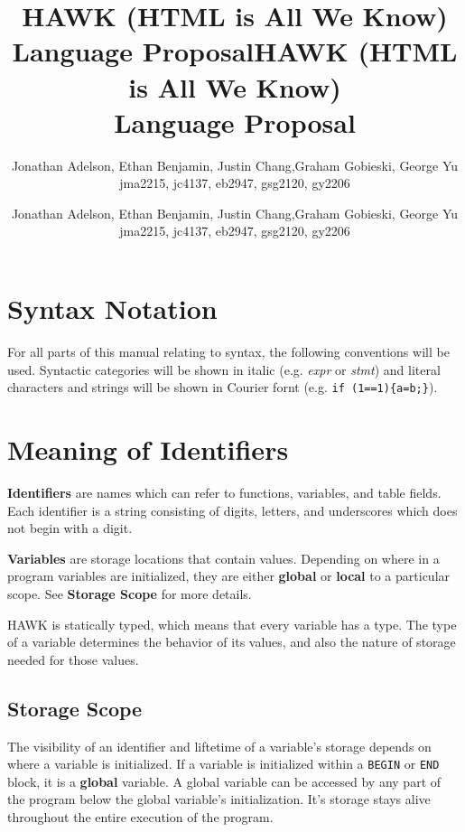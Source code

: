 \documentclass[12pt]{article}
\title{HAWK (HTML is All We Know)\\
Language Proposal}
\author{Jonathan Adelson, Ethan Benjamin, Justin Chang,Graham Gobieski, George Yu\\
jma2215, jc4137, eb2947, gsg2120, gy2206}
\date{}
\newcommand{\setdocdata}{
\title{HAWK (HTML is All We Know)\\
Language Proposal}
\author{Jonathan Adelson, Ethan Benjamin, Justin Chang,Graham Gobieski, George Yu\\
jma2215, jc4137, eb2947, gsg2120, gy2206}
\date{}
}
\begin{document}


\setdocdata
\maketitle

\section*{Syntax Notation}

For all parts of this manual relating to syntax, the following conventions will be used. Syntactic categories will be shown in italic (e.g. \textit{expr} or \textit{stmt}) and literal characters and strings will be shown in Courier fornt (e.g. \texttt{if (1==1)\{a=b;\}}).

\section*{Meaning of Identifiers}

\textbf{Identifiers} are names which can refer to functions, variables, and table fields. Each identifier is a string consisting of digits, letters, and underscores which does not begin with a digit.

\textbf{Variables} are storage locations that contain values. Depending on where in a program variables are initialized, they are either \textbf{global} or \textbf{local} to a particular scope. See \textbf{Storage Scope} for more details.

HAWK is statically typed, which means that every variable has a type. The type of a variable determines the behavior of its values, and also the nature of storage needed for those values. 


\subsection*{Storage Scope}

The visibility of an identifier and liftetime of a variable's storage depends on where a variable is initialized. If a variable is initialized within a \texttt{BEGIN} or \texttt{END} block, it is a \textbf{global} variable. A global variable can be accessed by any part of the program below the global variable's initialization. It's storage stays alive throughout the entire execution of the program.
\end{document}
